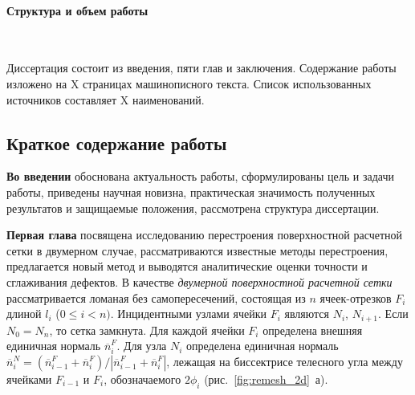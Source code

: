 \documentclass[a4paper,14pt]{extarticle}                     %
\theoremstyle{plain}                                         %
\begin{document}
\paragraph{Структура и объем работы} 

\

Диссертация состоит из введения, пяти глав и заключения.
Содержание работы изложено на X страницах машинописного текста.
Список использованных источников составляет X наименований.


\newpage
\subsection*{Краткое содержание работы}

\textbf{Во введении} обоснована актуальность работы, сформулированы цель и задачи работы, приведены научная новизна, практическая значимость полученных результатов и защищаемые положения, рассмотрена структура диссертации. 




\textbf{Первая глава} посвящена исследованию перестроения поверхностной расчетной сетки в двумерном случае, рассматриваются известные методы перестроения, предлагается новый метод и выводятся аналитические оценки точности и сглаживания дефектов.
В качестве \textit{двумерной поверхностной расчетной сетки} рассматривается ломаная без самопересечений, состоящая из $n$ ячеек-отрезков $F_i$ длиной $l_i$ ($0 \le i < n)$.
Инцидентными узлами ячейки $F_i$ являются $N_i$, $N_{i + 1}$.
Если $N_0 = N_n$, то сетка замкнута.
Для каждой ячейки $F_i$ определена внешняя единичная нормаль $\overline{n}_i^F$.
Для узла $N_i$ определена единичная нормаль $\overline{n}_i^N = (\overline{n}_{i-1}^F + \overline{n}_i^F) / |\overline{n}_{i-1}^F + \overline{n}_i^F|$, лежащая на биссектрисе телесного угла между ячейками $F_{i - 1}$ и $F_i$, обозначаемого $2 \phi_i$ (рис.~\ref{fig:remesh_2d}~а).
\end{document}
